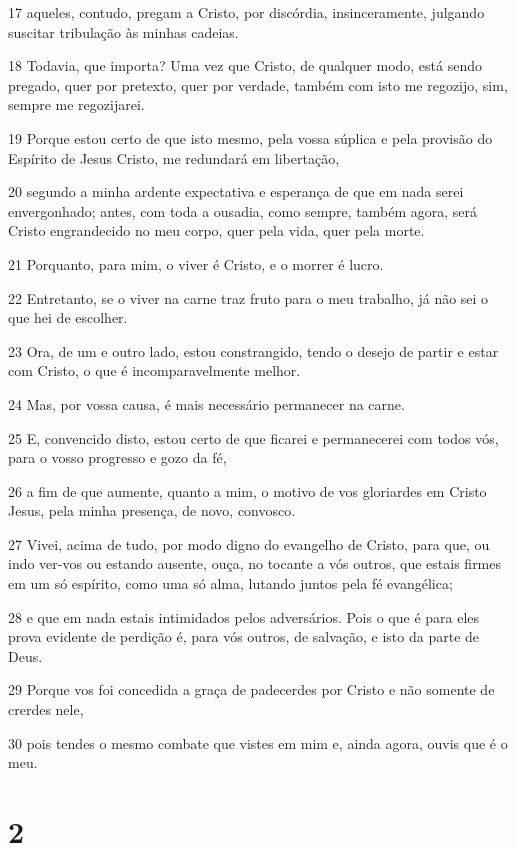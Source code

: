 \par 17 aqueles, contudo, pregam a Cristo, por discórdia, insinceramente, julgando suscitar tribulação às minhas cadeias.
\par 18 Todavia, que importa? Uma vez que Cristo, de qualquer modo, está sendo pregado, quer por pretexto, quer por verdade, também com isto me regozijo, sim, sempre me regozijarei.
\par 19 Porque estou certo de que isto mesmo, pela vossa súplica e pela provisão do Espírito de Jesus Cristo, me redundará em libertação,
\par 20 segundo a minha ardente expectativa e esperança de que em nada serei envergonhado; antes, com toda a ousadia, como sempre, também agora, será Cristo engrandecido no meu corpo, quer pela vida, quer pela morte.
\par 21 Porquanto, para mim, o viver é Cristo, e o morrer é lucro.
\par 22 Entretanto, se o viver na carne traz fruto para o meu trabalho, já não sei o que hei de escolher.
\par 23 Ora, de um e outro lado, estou constrangido, tendo o desejo de partir e estar com Cristo, o que é incomparavelmente melhor.
\par 24 Mas, por vossa causa, é mais necessário permanecer na carne.
\par 25 E, convencido disto, estou certo de que ficarei e permanecerei com todos vós, para o vosso progresso e gozo da fé,
\par 26 a fim de que aumente, quanto a mim, o motivo de vos gloriardes em Cristo Jesus, pela minha presença, de novo, convosco.
\par 27 Vivei, acima de tudo, por modo digno do evangelho de Cristo, para que, ou indo ver-vos ou estando ausente, ouça, no tocante a vós outros, que estais firmes em um só espírito, como uma só alma, lutando juntos pela fé evangélica;
\par 28 e que em nada estais intimidados pelos adversários. Pois o que é para eles prova evidente de perdição é, para vós outros, de salvação, e isto da parte de Deus.
\par 29 Porque vos foi concedida a graça de padecerdes por Cristo e não somente de crerdes nele,
\par 30 pois tendes o mesmo combate que vistes em mim e, ainda agora, ouvis que é o meu.

\chapter{2}

